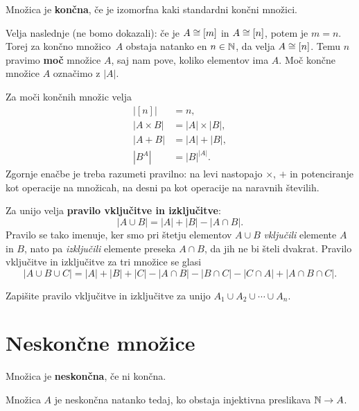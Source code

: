\begin{definicija}
  Množica je \textbf{končna}, če je izomorfna kaki standardni končni množici.
\end{definicija}


Velja naslednje (ne bomo dokazali): če je $A \cong [m]$ in $A \cong [n]$, potem je $m = n$. Torej za končno
množico~$A$ obstaja natanko en $n \in \mathbb{N}$, da velja $A \cong [n]$. Temu $n$ pravimo \textbf{moč} množice $A$,
saj nam pove, koliko elementov ima $A$. Moč končne množice $A$ označimo z $|A|$.

Za moči končnih množic velja
%
\begin{align*}
  |[n]| &= n, \\
  |A \times B| &= |A| \times |B|, \\
  |A + B| &= |A| + |B|, \\
  |B^A| &= |B|^{|A|}.
\end{align*}
%
Zgornje enačbe je treba razumeti pravilno: na levi nastopajo $\times$, $+$ in potenciranje kot operacije na množicah, na desni pa kot operacije na naravnih številih.

Za unijo velja \textbf{pravilo vključitve in izključitve}:
%
\begin{equation*}
 |A \cup B| = |A| + |B| - |A \cap B|.
\end{equation*}
%
Pravilo se tako imenuje, ker smo pri štetju elementov $A \cup B$ \emph{vključili} elemente $A$ in $B$, nato pa \emph{izključili} elemente preseka $A \cap B$, da jih ne bi šteli dvakrat.
%
Pravilo vključitve in izključitve za tri množice se glasi
%
\begin{equation*}
  |A \cup B \cup C| = |A| + |B| + |C| - |A \cap B| - |B \cap C| - |C \cap A| + |A \cap B \cap C|.
\end{equation*}

\begin{vaja}
  Zapišite pravilo vključitve in izključitve za unijo $A_1 \cup A_2 \cup \cdots \cup A_n$.
\end{vaja}


\section{Neskončne množice}

\begin{definicija}
  Množica je \textbf{neskončna}, če ni končna.
\end{definicija}

\begin{izrek}
  Množica $A$ je neskončna natanko tedaj, ko obstaja injektivna preslikava $\mathbb{N} \to A$.
\end{izrek}


